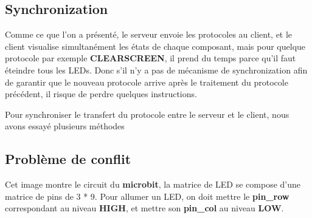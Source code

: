 \documentclass[14px]{article}
\begin{document}
\subsection{Synchronization}
Comme ce que l'on a présenté, le serveur envoie les protocoles au client, et le client visualise simultanément les états de chaque composant, mais pour quelque protocole par exemple \textbf{CLEARSCREEN}, il prend du temps parce qu'il faut éteindre tous les LEDs. Donc s'il n'y a pas de mécanisme de synchronization afin de garantir que le nouveau protocole arrive après le traitement du protocole précédent, il risque de perdre quelques instructions.

Pour synchroniser le transfert du protocole entre le serveur et le client, nous avons essayé plusieurs méthodes 


\clearpage

\subsection{Problème de conflit}
\begin{figure}[htbp]
\end{figure}
Cet image montre le circuit du \textbf{microbit}, la matrice de LED se compose d'une matrice de pins de 3 * 9. Pour allumer un LED, on doit mettre le \textbf{pin\_row} correspondant au niveau \textbf{HIGH}, et mettre son \textbf{pin\_col} au niveau \textbf{LOW}.
\end{document}
